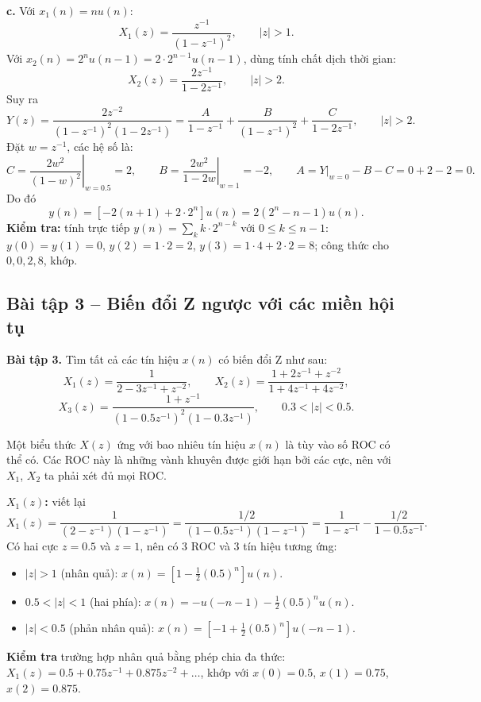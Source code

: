 \documentclass[12pt,a4paper]{article}
\begin{document}
\textbf{c.} Với $x_1(n) = n u(n)$:
\[
    X_1(z) = \frac{z^{-1}}{(1 - z^{-1})^2}, \qquad |z| > 1.
\]
Với $x_2(n) = 2^n u(n-1) = 2 \cdot 2^{n-1} u(n-1)$, dùng tính chất dịch thời gian:
\[
    X_2(z) = \frac{2 z^{-1}}{1 - 2 z^{-1}}, \qquad |z| > 2.
\]
Suy ra
\[
    Y(z) = \frac{2 z^{-2}}{(1 - z^{-1})^2 (1 - 2 z^{-1})} = \frac{A}{1 - z^{-1}} + \frac{B}{(1 - z^{-1})^2} + \frac{C}{1 - 2 z^{-1}}, \qquad |z| > 2.
\]
Đặt $w = z^{-1}$, các hệ số là:
\[
    C = \left.\frac{2w^2}{(1 - w)^2}\right|_{w = 0.5} = 2,
    \qquad
    B = \left.\frac{2w^2}{1 - 2w}\right|_{w = 1} = -2,
    \qquad
    A = Y\big|_{w=0} - B - C = 0 + 2 - 2 = 0.
\]
Do đó
\begin{equation}
    y(n) = \left[-2(n+1) + 2 \cdot 2^n\right] u(n) = 2\left(2^n - n - 1\right) u(n).
\end{equation}
\textbf{Kiểm tra:} tính trực tiếp $y(n) = \sum_{k} k \cdot 2^{n-k}$ với $0 \le k \le n-1$: $y(0) = y(1) = 0$, $y(2) = 1 \cdot 2 = 2$, $y(3) = 1 \cdot 4 + 2 \cdot 2 = 8$; công thức cho $0, 0, 2, 8$, khớp.

\subsection{Bài tập 3 -- Biến đổi Z ngược với các miền hội tụ}
\begin{mdframed}[style=exbox]
\noindent\textbf{Bài tập 3.} Tìm tất cả các tín hiệu $x(n)$ có biến đổi Z như sau:
\[
    X_1(z) = \frac{1}{2 - 3z^{-1} + z^{-2}},
    \qquad
    X_2(z) = \frac{1 + 2z^{-1} + z^{-2}}{1 + 4z^{-1} + 4z^{-2}},
\]
\[
    X_3(z) = \frac{1 + z^{-1}}{(1 - 0.5z^{-1})^2 (1 - 0.3z^{-1})}, \qquad 0.3 < |z| < 0.5.
\]
\end{mdframed}

Một biểu thức $X(z)$ ứng với bao nhiêu tín hiệu $x(n)$ là tùy vào số ROC có thể có. Các ROC này là những vành khuyên được giới hạn bởi các cực, nên với $X_1$, $X_2$ ta phải xét đủ mọi ROC.

\textbf{$X_1(z)$:} viết lại
\[
    X_1(z) = \frac{1}{(2 - z^{-1})(1 - z^{-1})} = \frac{1/2}{(1 - 0.5z^{-1})(1 - z^{-1})} = \frac{1}{1 - z^{-1}} - \frac{1/2}{1 - 0.5z^{-1}}.
\]
Có hai cực $z = 0.5$ và $z = 1$, nên có 3 ROC và 3 tín hiệu tương ứng:
\begin{itemize}
    \item $|z| > 1$ (nhân quả): $x(n) = \left[1 - \frac{1}{2}(0.5)^n\right] u(n)$.
    \item $0.5 < |z| < 1$ (hai phía): $x(n) = -u(-n-1) - \frac{1}{2}(0.5)^n u(n)$.
    \item $|z| < 0.5$ (phản nhân quả): $x(n) = \left[-1 + \frac{1}{2}(0.5)^n\right] u(-n-1)$.
\end{itemize}
\textbf{Kiểm tra} trường hợp nhân quả bằng phép chia đa thức: $X_1(z) = 0.5 + 0.75z^{-1} + 0.875z^{-2} + \dots$, khớp với $x(0) = 0.5$, $x(1) = 0.75$, $x(2) = 0.875$.
\end{document}
